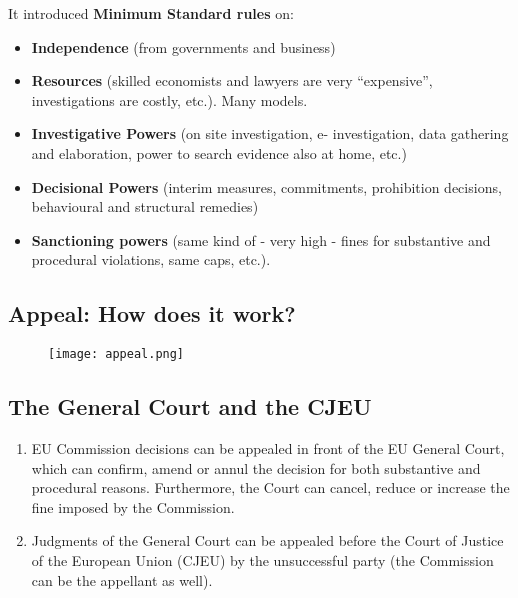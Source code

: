 
            It introduced \textbf{Minimum Standard rules} on:
            \begin{itemize}
                \item \textbf{Independence} (from governments and business) 
                \item \textbf{Resources} (skilled economists and lawyers are very “expensive”, investigations are costly, etc.). Many models. 
                \item \textbf{Investigative Powers} (on site investigation, e- investigation, data gathering and elaboration, power to search evidence also at home, etc.) 
                \item \textbf{Decisional Powers} (interim measures, commitments, prohibition decisions, behavioural and structural remedies) 
                \item \textbf{Sanctioning powers} (same kind of - very high - fines for substantive and procedural violations, same caps, etc.).
            \end{itemize}

\newpage
    \subsection{Appeal: How does it work?}

        \begin{figure}[h]
            \centering
            \texttt{[image: appeal.png]}
        \end{figure}

    \subsection{The General Court and the CJEU}

    \begin{enumerate}
        \item EU Commission decisions can be appealed in front of the EU General Court, which can confirm, amend or annul the decision for both substantive and procedural reasons. Furthermore, the Court can cancel, reduce or increase the fine imposed by the Commission.
        \item Judgments of the General Court can be appealed before the Court of Justice of the European Union (CJEU) by the unsuccessful party (the Commission can be the appellant as well).
    \end{enumerate}

